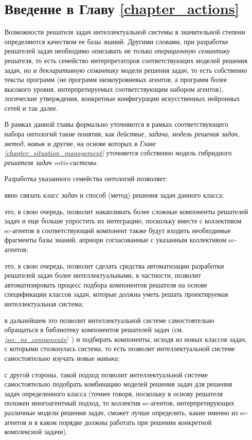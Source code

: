 \section*{Введение в Главу \ref{chapter_actions}}
Возможности решателя задач интеллектуальной системы в значительной степени определяются качеством ее базы знаний. Другими словами, при разработке решателей задач необходимо описывать не только \textit{операционную семантику} решателя, то есть семейство интерпретаторов соответствующих моделей решения задач, но и \textit{декларативную семантику} модели решения задач, то есть собственно тексты программ (не программ низкоуровневых агентов, а программ более высокого уровня, интерпретируемых соответствующим набором агентов), логические утверждения, конкретные конфигурации искусственных нейронных сетей и так далее.

В рамках данной главы формально уточняются в рамках соответствующего набора онтологий такие понятия, как \textit{действие}, \textit{задача}, \textit{модель решения задач}, \textit{метод}, \textit{навык} и другие, на основе которых в \textit{Главе \ref{chapter_situation_management} } уточняется собственно модель гибридного \textit{решателя задач ostis-системы}.

Разработка указанного семейства онтологий позволяет:
\begin{textitemize}
	\item явно связать \textit{класс задач} и способ (метод) решения задач данного класса;
	\item это, в свою очередь, позволит накапливать более сложные компоненты решателей задач и еще больше упростить их интеграцию, поскольку вместе с коллективом sc-агентов в соответствующий компонент также будут входить необходимые фрагменты базы знаний, априори согласованные с указанным коллективом sc-агентов;
	\item это, в свою очередь, позволит сделать средства автоматизации разработки решателей задач более интеллектуальными, в частности, позволит автоматизировать процесс подбора компонентов решателя на основе спецификации классов задач, которые должна уметь решать проектируемая интеллектуальная система;
	\item в дальнейшем это позволит интеллектуальной системе самостоятельно обращаться в библиотеку компонентов решателей задач (см. \textit{\ref{sec_ps_components}~}) и подбирать компоненты, исходя из новых классов задач, с которыми столкнулась система, то есть позволит интеллектуальной системе самостоятельно изучать новые \textit{навыки};
	\item с другой стороны, такой подход позволит интеллектуальной системе самостоятельно подобрать комбинацию моделей решения задач для решения задач определенного класса (точнее говоря, поскольку в основу решателя положен многоагентный подход, то коллектив sc-агентов, интерпретирующих различные модели решения задач, сможет лучше определить, какие именно из sc-агентов и в каком порядке должны работать при решении конкретной комплексной задачи).
\end{textitemize}


